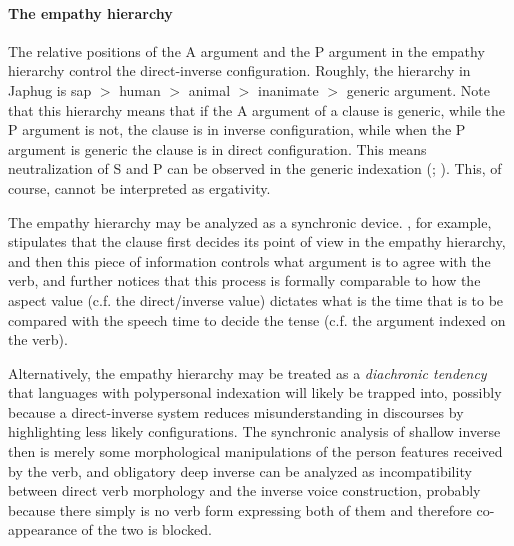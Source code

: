 \documentclass[a4paper, oneside, 12pt]{report}
\newcommand*{\textgt}{$>$ }
\newcommand*{\citesec}[1]{\S~{#1}}
\begin{document}
\paragraph*{The empathy hierarchy}\label{sec:grammatical.clause.direct-inverse.hierarchy} 
The relative positions of the A argument and the P argument in the empathy hierarchy
control the direct-inverse configuration.
Roughly, the hierarchy in Japhug is 
\ac{sap} \textgt human \textgt animal \textgt inanimate \textgt generic argument.
Note that this hierarchy means that
if the A argument of a clause is generic,
while the P argument is not,
the clause is in inverse configuration,
while when the P argument is generic the clause is in direct configuration.
This means neutralization of S and P can be observed in the generic indexation
(\citealt{jacques2012argument}; \citealt[\citesec{14.3.2.5}]{jacques2021grammar}).
This, of course, cannot be interpreted as ergativity.

The empathy hierarchy may be analyzed as a synchronic device. 
\citet[\citesec{7.4}]{wiltschko2014universal}, for example,
stipulates that the clause first decides its point of view in the empathy hierarchy,
and then this piece of information controls what argument is to agree with the verb,
and further notices that this process is formally comparable to
how the aspect value (c.f. the direct/inverse value) 
dictates what is the time that is to be compared with the speech time to decide the tense
(c.f. the argument indexed on the verb).

Alternatively, the empathy hierarchy may be treated as a \emph{diachronic tendency}
that languages with polypersonal indexation will likely be trapped into,
possibly because a direct-inverse system reduces misunderstanding in discourses
by highlighting less likely configurations.
The synchronic analysis of shallow inverse then is merely 
some morphological manipulations of the person features received by the verb,
and obligatory deep inverse can be analyzed as incompatibility between
direct verb morphology and the inverse voice construction,
probably because there simply is no verb form expressing both of them
and therefore co-appearance of the two is blocked.
\end{document}
